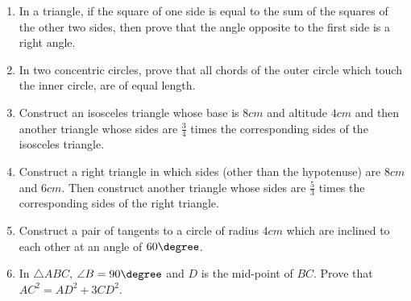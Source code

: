 \begin{enumerate}
\item In a triangle, if the square of one side is equal to the sum of the squares of the other two sides, then prove that the angle opposite to the first side is a right angle.

\item In two concentric circles, prove that all chords of the outer circle which touch the inner circle, are of equal length.

\item Construct an isosceles triangle whose base is $8 cm$ and altitude $4 cm$ and then another triangle whose sides are $\frac{3}{4}$ times the corresponding sides of the isosceles triangle.

\item Construct a right triangle in which sides (other than the hypotenuse) are $8 cm$ and $6 cm$. Then construct another triangle whose sides are $\frac{5}{3}$ times the corresponding sides of the right triangle.

\item Construct a pair of tangents to a circle of radius $4 cm$ which are inclined to each other at an angle of $60\degree$.

\item In ${\triangle ABC}$, ${\angle B} = {90\degree}$ and $D$ is the mid-point of $BC$. Prove that ${AC}^2 = {AD}^2 + 3{CD}^2$.


\end{enumerate}
